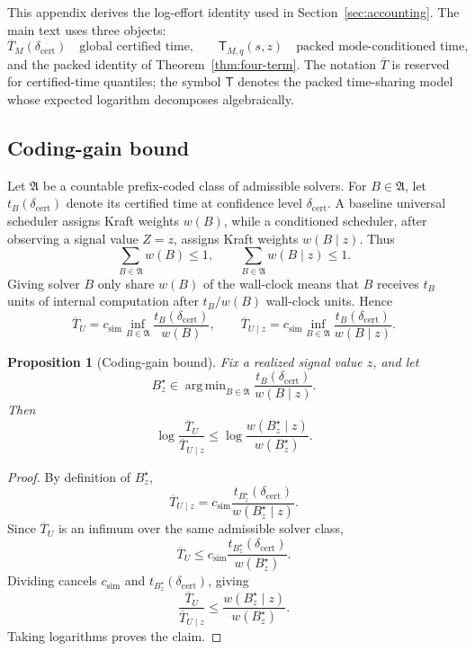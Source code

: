 \documentclass{article}
\newtheorem{proposition}{Proposition}
\DeclareMathOperator*{\argmin}{arg\,min}
\begin{document}
This appendix derives the log-effort identity used in Section~\ref{sec:accounting}.
The main text uses three objects:
\[
    \overline T_M(\delta_{\mathrm{cert}})
    \quad\text{global certified time,}
    \qquad
    \mathsf T_{M,q}(s,z)
    \quad\text{packed mode-conditioned time,}
\]
and the packed identity of Theorem~\ref{thm:four-term}.
The notation \(\overline T\) is reserved for certified-time quantiles; the symbol
\(\mathsf T\) denotes the packed time-sharing model whose expected logarithm decomposes
algebraically.

\subsection{Coding-gain bound}

Let \(\mathfrak A\) be a countable prefix-coded class of admissible solvers.  For
\(B\in\mathfrak A\), let \(t_B(\delta_{\mathrm{cert}})\) denote its certified time at
confidence level \(\delta_{\mathrm{cert}}\).  A baseline universal scheduler assigns Kraft
weights \(w(B)\), while a conditioned scheduler, after observing a signal value \(Z=z\),
assigns Kraft weights \(w(B\mid z)\).  Thus
\[
    \sum_{B\in\mathfrak A}w(B)\le 1,
    \qquad
    \sum_{B\in\mathfrak A}w(B\mid z)\le 1.
\]
Giving solver \(B\) only share \(w(B)\) of the wall-clock means that \(B\) receives
\(t_B\) units of internal computation after \(t_B/w(B)\) wall-clock units.  Hence
\[
    \overline T_U
    =
    c_{\mathrm{sim}}
    \inf_{B\in\mathfrak A}
    \frac{t_B(\delta_{\mathrm{cert}})}{w(B)},
    \qquad
    \overline T_{U\mid z}
    =
    c_{\mathrm{sim}}
    \inf_{B\in\mathfrak A}
    \frac{t_B(\delta_{\mathrm{cert}})}{w(B\mid z)}.
\]

\begin{proposition}[Coding-gain bound]
\label{prop:app-coding-gain}
Fix a realized signal value \(z\), and let
\[
    B_z^\star
    \in
    \argmin_{B\in\mathfrak A}
    \frac{t_B(\delta_{\mathrm{cert}})}{w(B\mid z)}.
\]
Then
\[
    \log\frac{\overline T_U}{\overline T_{U\mid z}}
    \le
    \log\frac{w(B_z^\star\mid z)}{w(B_z^\star)}.
\]
\end{proposition}

\begin{proof}
By definition of \(B_z^\star\),
\[
    \overline T_{U\mid z}
    =
    c_{\mathrm{sim}}
    \frac{t_{B_z^\star}(\delta_{\mathrm{cert}})}
         {w(B_z^\star\mid z)}.
\]
Since \(\overline T_U\) is an infimum over the same admissible solver class,
\[
    \overline T_U
    \le
    c_{\mathrm{sim}}
    \frac{t_{B_z^\star}(\delta_{\mathrm{cert}})}
         {w(B_z^\star)}.
\]
Dividing cancels \(c_{\mathrm{sim}}\) and \(t_{B_z^\star}(\delta_{\mathrm{cert}})\), giving
\[
    \frac{\overline T_U}{\overline T_{U\mid z}}
    \le
    \frac{w(B_z^\star\mid z)}{w(B_z^\star)}.
\]
Taking logarithms proves the claim.
\end{proof}
\end{document}
